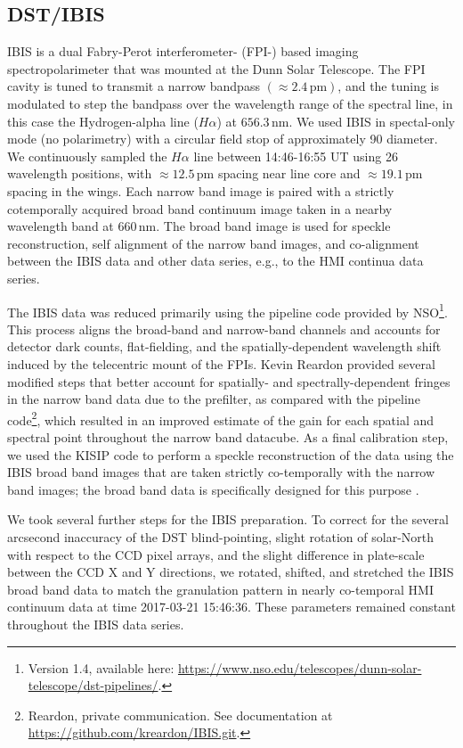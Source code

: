 \documentclass[twocolumn]{aastex62}
\newcommand{\unit}[1]{\ensuremath{\, \mathrm{#1}}}
\newcommand{\halpha}{\ensuremath{H\alpha}}
\begin{document}
\subsection{DST/IBIS}
IBIS is a dual Fabry-Perot interferometer- (FPI-) based imaging spectropolarimeter that was mounted at the Dunn Solar Telescope.
The FPI cavity is tuned to transmit a narrow bandpass $(\approx 2.4\unit{pm})$, and the tuning is modulated to step the bandpass over the wavelength range of the spectral line, in this case the Hydrogen-alpha line (\halpha{}) at $656.3\unit{nm}$.
We used IBIS in spectal-only mode (no polarimetry) with a circular field stop of approximately 90\arcsec{} diameter.
We continuously sampled the \halpha{} line between 14:46-16:55 UT using 26 wavelength positions, with $\approx 12.5\unit{pm}$ spacing near line core and $\approx 19.1\unit{pm}$ spacing in the wings.  
Each narrow band image is paired with a strictly cotemporally acquired broad band continuum image taken in a nearby wavelength band at $660\unit{nm}$.
The broad band image is used for speckle reconstruction, self alignment of the narrow band images, and co-alignment between the IBIS data and other data series, e.g., to the HMI continua data series. \par

The IBIS data was reduced primarily using the pipeline code provided by NSO\footnote{Version 1.4, available here: \url{https://www.nso.edu/telescopes/dunn-solar-telescope/dst-pipelines/}.}.  
This process aligns the broad-band and narrow-band channels and accounts for detector dark counts, flat-fielding, and the spatially-dependent wavelength shift induced by the telecentric mount of the FPIs.  
Kevin Reardon provided several modified steps that better account for spatially- and spectrally-dependent fringes in the narrow band data due to the prefilter, as compared with the pipeline code\footnote{Reardon, private communication.  See documentation at \url{https://github.com/kreardon/IBIS.git}.}, which resulted in an improved estimate of the gain for each spatial and spectral point throughout the narrow band datacube.  
As a final calibration step, we used the KISIP code \citep{2008WoegerSPIE,2008WoegerEA_Speckle} to perform a speckle reconstruction of the data using the IBIS broad band images that are taken strictly co-temporally with the narrow band images; the broad band data is specifically designed for this purpose \citep{2008Cauzzi}.\par

We took several further steps for the IBIS preparation.  
To correct for the several arcsecond inaccuracy of the DST blind-pointing, slight rotation of solar-North with respect to the CCD pixel arrays, and the slight difference in plate-scale between the CCD X and Y directions, we rotated, shifted, and stretched the IBIS broad band data to match the granulation pattern in nearly co-temporal HMI continuum data at time 2017-03-21 15:46:36.
These parameters remained constant throughout the IBIS data series.
\par
\end{document}
